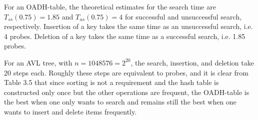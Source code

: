 

For an OADH-table, the theoretical estimates for the search 
time are \(T_{ss}(0.75)=1.85\) and \(T_{us}(0.75)=4\) for successful and 
unsuccessful search, respectively. Insertion of a key takes the same time as 
an unsuccessful search, i.e. 4 probes. Deletion of a key takes the 
same time as a successful search, i.e. 1.85 probes.

For an AVL tree, with \(n=1048576=2^{20}\), the search, insertion, and deletion take 
20 steps each. Roughly these steps are equivalent to probes, and it is clear 
from Table 3.5 that since sorting is not a requirement and the hash table                               %
is constructed only once but the other operations are frequent, the OADH-table 
is the best when one only wants to search and remains still the best when one 
wants to insert and delete items frequently.
\fi

